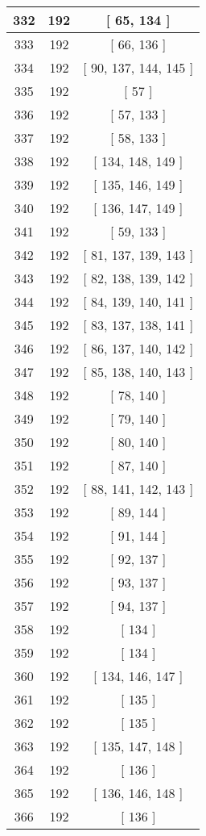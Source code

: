 \begin{center}
\begin{longtable}[H]{|| c c c ||}
332 & 192 & [ 65, 134 ]
\\\hline
333 & 192 & [ 66, 136 ]
\\\hline
334 & 192 & [ 90, 137, 144, 145 ]
\\\hline
335 & 192 & [ 57 ]
\\\hline
336 & 192 & [ 57, 133 ]
\\\hline
337 & 192 & [ 58, 133 ]
\\\hline
338 & 192 & [ 134, 148, 149 ]
\\\hline
339 & 192 & [ 135, 146, 149 ]
\\\hline
340 & 192 & [ 136, 147, 149 ]
\\\hline
341 & 192 & [ 59, 133 ]
\\\hline
342 & 192 & [ 81, 137, 139, 143 ]
\\\hline
343 & 192 & [ 82, 138, 139, 142 ]
\\\hline
344 & 192 & [ 84, 139, 140, 141 ]
\\\hline
345 & 192 & [ 83, 137, 138, 141 ]
\\\hline
346 & 192 & [ 86, 137, 140, 142 ]
\\\hline
347 & 192 & [ 85, 138, 140, 143 ]
\\\hline
348 & 192 & [ 78, 140 ]
\\\hline
349 & 192 & [ 79, 140 ]
\\\hline
350 & 192 & [ 80, 140 ]
\\\hline
351 & 192 & [ 87, 140 ]
\\\hline
352 & 192 & [ 88, 141, 142, 143 ]
\\\hline
353 & 192 & [ 89, 144 ]
\\\hline
354 & 192 & [ 91, 144 ]
\\\hline
355 & 192 & [ 92, 137 ]
\\\hline
356 & 192 & [ 93, 137 ]
\\\hline
357 & 192 & [ 94, 137 ]
\\\hline
358 & 192 & [ 134 ]
\\\hline
359 & 192 & [ 134 ]
\\\hline
360 & 192 & [ 134, 146, 147 ]
\\\hline
361 & 192 & [ 135 ]
\\\hline
362 & 192 & [ 135 ]
\\\hline
363 & 192 & [ 135, 147, 148 ]
\\\hline
364 & 192 & [ 136 ]
\\\hline
365 & 192 & [ 136, 146, 148 ]
\\\hline
366 & 192 & [ 136 ]
\\\hline

\end{longtable}
\end{center}
